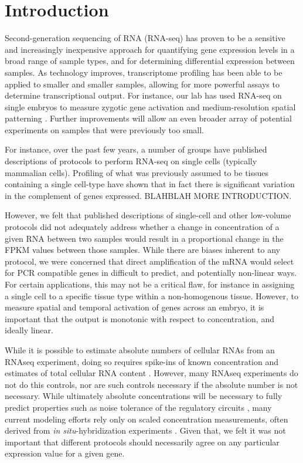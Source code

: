 \section{Introduction}
Second-generation sequencing of RNA (RNA-seq) has proven to be a sensitive and increasingly inexpensive approach for quantifying gene expression levels in a broad range of sample types, and for determining differential expression between samples.  As technology improves, transcriptome profiling has been able to be applied to smaller and smaller samples, allowing for more powerful assays to determine transcriptional output.  For instance, our lab has used RNA-seq on single embryos to measure zygotic gene activation \cite{Lott:2011cc} and medium-resolution spatial patterning \cite{Combs:2013jy}.  Further improvements will allow an even broader array of potential experiments on samples that were previously too small.

For instance, over the past few years, a number of groups have published descriptions of protocols to perform RNA-seq on single cells (typically mammalian cells). Profiling of what was previously assumed to be tissues containing a single cell-type have shown that in fact there is significant variation in the complement of genes expressed. BLAHBLAH MORE INTRODUCTION. 

However, we felt that published descriptions of single-cell and other low-volume protocols did not adequately address whether a change in concentration of a given RNA between two samples would result in a proportional change in the FPKM values between those samples. While there are biases inherent to any protocol, we were concerned that direct amplification of the mRNA would select for PCR compatible genes in difficult to predict, and potentially non-linear ways.  For certain applications, this may not be a critical flaw, for instance in assigning a single cell to a specific tissue type within a non-homogenous tissue.  However, to measure spatial and temporal activation of genes across an embryo, it is important that the output is monotonic with respect to concentration, and ideally linear.


While it is possible to estimate absolute numbers of cellular RNAs from an RNAseq experiment, doing so requires spike-ins of known concentration and estimates of total cellular RNA content \cite{Mortazavi:2008jj}. However, many RNAseq experiments do not do this controls, nor are such controls necessary if the absolute number is not necessary. While ultimately absolute concentrations will be necessary to fully predict properties such as noise tolerance of the regulatory circuits \cite{Gregor:2007du,Gregor:2005jn}, many current modeling efforts rely only on scaled concentration measurements, often derived from {\em in situ}-hybridization experiments \cite{Garcia:2013fs,Ilsley:2013fk,He:2010ix}.  Given that, we felt it was not important that different protocols should necessarily agree on any particular expression value for a given gene.

